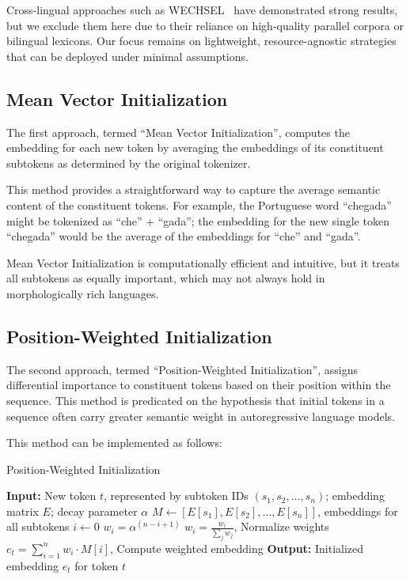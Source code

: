 Cross-lingual approaches such as WECHSEL~\cite{minixhofer2021wechsel} have demonstrated strong results, but we exclude them here due to their reliance on high-quality parallel corpora or bilingual lexicons. Our focus remains on lightweight, resource-agnostic strategies that can be deployed under minimal assumptions.


\subsection{Mean Vector Initialization}
\label{subsec:mean-init}

The first approach, termed ``Mean Vector Initialization'', computes the embedding for each new token by averaging the embeddings of its constituent subtokens as determined by the original tokenizer. 

This method provides a straightforward way to capture the average semantic content of the constituent tokens. For example, the Portuguese word ``chegada'' might be tokenized as ``che'' + ``gada''; the embedding for the new single token ``chegada'' would be the average of the embeddings for ``che'' and ``gada''. 

Mean Vector Initialization is computationally efficient and intuitive, but it treats all subtokens as equally important, which may not always hold in morphologically rich languages.


\subsection{Position-Weighted Initialization}
\label{subsec:pos-wei-init}

The second approach, termed ``Position-Weighted Initialization'', assigns differential importance to constituent tokens based on their position within the sequence. This method is predicated on the hypothesis that initial tokens in a sequence often carry greater semantic weight in autoregressive language models.

This method can be implemented as follows:

\begin{algorithm}[H]
    \caption{Position-Weighted Initialization}
    \begin{algorithmic}[1]
        \State \textbf{Input:} New token $t$, represented by subtoken IDs $(s_1, s_2, \dots, s_n)$; embedding matrix $E$; decay parameter $\alpha$
        \State $M \gets [E[s_1], E[s_2], \dots, E[s_n]]$, embeddings for all subtokens
        \State $i \gets 0$
            \State $w_i = \alpha^{(n-i+1)}$
            \State $w_i = \frac{w_i}{\sum_j w_j}$, Normalize weights
        \EndWhile
        \State $e_t = \sum_{i=1}^{n} w_i \cdot M[i]$, Compute weighted embedding
        \State \textbf{Output:} Initialized embedding $e_t$ for token $t$
    \end{algorithmic}
\end{algorithm}


